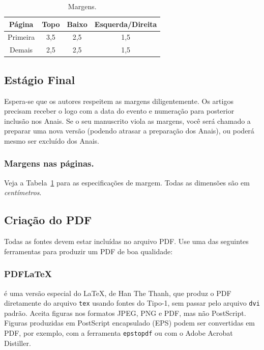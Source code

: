 \documentclass[a4paper]{ifacconf}
\begin{document}
\begin{table}[hb]
\begin{center}
\caption{Margens.}\label{tb:margins}
\begin{tabular}{cccc}
Página & Topo & Baixo & Esquerda/Direita \\\hline
Primeira & 3,5 & 2,5 & 1,5 \\
Demais & 2,5 & 2,5 & 1,5 \\ \hline
\end{tabular}
\end{center}
\end{table}

\subsection{Estágio Final}

Espera-se que os autores respeitem as margens diligentemente. 
Os artigos precisam receber o logo com a data do evento e numeração para
posterior inclusão nos Anais. Se o seu manuscrito viola as margens, você será
chamado a preparar uma nova versão (podendo atrasar a preparação dos Anais), ou 
poderá mesmo ser excluído dos Anais. 


\subsubsection{Margens nas páginas.} Veja a Tabela~\ref{tb:margins} 
para as especificações de margem. Todas as dimensões são em 
\emph{centímetros}.


\subsection{Criação do PDF}

Todas as fontes devem estar incluídas no arquivo PDF. Use uma das seguintes
ferramentas para produzir um PDF de boa qualidade: 

\subsubsection{PDFLaTeX} 
é uma versão especial do \LaTeX, de Han The
Thanh, que produz o PDF diretamente do arquivo \texttt{tex} usando fontes do Tipo-1,
sem passar pelo arquivo \texttt{dvi} padrão. Aceita figuras nos formatos JPEG, PNG e PDF,
mas não PostScript. Figuras produzidas em PostScript encapsulado (EPS) podem
ser convertidas em PDF, por exemplo, com a ferramenta \texttt{epstopdf} ou
com o Adobe Acrobat
Distiller.
\end{document}
